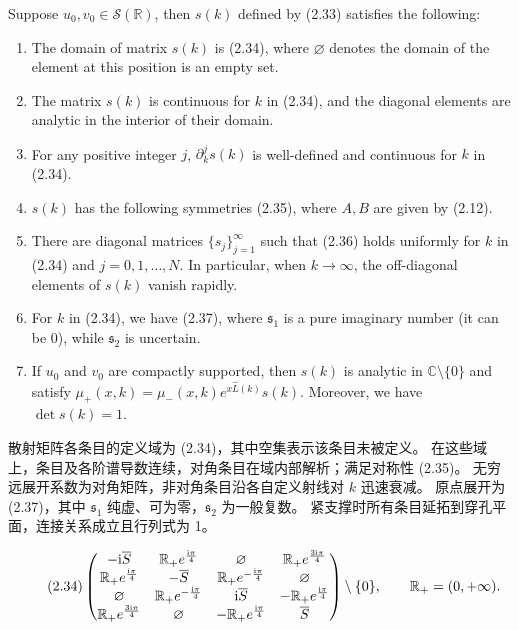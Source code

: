 \begin{paperpropositionen}\label{prop:2.4}
Suppose $u_0,v_0\in\mathcal S(\mathbb R)$, then $s(k)$ defined by (2.33) satisfies the following:
\begin{enumerate}[label=\alph*.]
\item The domain of matrix $s(k)$ is (2.34), where $\varnothing$ denotes the domain of the element at this position is an empty set.
\item The matrix $s(k)$ is continuous for $k$ in (2.34), and the diagonal elements are analytic in the interior of their domain.
\item For any positive integer $j$, $\partial_k^j s(k)$ is well-defined and continuous for $k$ in (2.34).
\item $s(k)$ has the following symmetries (2.35), where $A,B$ are given by (2.12).
\item There are diagonal matrices $\{s_j\}_{j=1}^\infty$ such that (2.36) holds uniformly for $k$ in (2.34) and $j=0,1,\ldots,N$. In particular, when $k\to\infty$, the off-diagonal elements of $s(k)$ vanish rapidly.
\item For $k$ in (2.34), we have (2.37), where $\mathfrak s_1$ is a pure imaginary number (it can be 0), while $\mathfrak s_2$ is uncertain.
\item If $u_0$ and $v_0$ are compactly supported, then $s(k)$ is analytic in $\mathbb C\setminus\{0\}$ and satisfy $\mu_+(x,k)=\mu_-(x,k)e^{x\widehat L(k)}s(k)$. Moreover, we have $\det s(k)=1$.
\end{enumerate}
\end{paperpropositionen}
\begin{paperpropositioncn*}
散射矩阵各条目的定义域为 (2.34)，其中空集表示该条目未被定义。
在这些域上，条目及各阶谱导数连续，对角条目在域内部解析；满足对称性 (2.35)。
无穷远展开系数为对角矩阵，非对角条目沿各自定义射线对 $k$ 迅速衰减。
原点展开为 (2.37)，其中 $\mathfrak s_1$ 纯虚、可为零，$\mathfrak s_2$ 为一般复数。
紧支撑时所有条目延拓到穿孔平面，连接关系成立且行列式为 1。
\end{paperpropositioncn*}
\begin{equation}
\originaleq{2.34}
\begin{pmatrix}
-\ii\overline S&\mathbb R_+e^{\frac{\ii\pi}{4}}&\varnothing&\mathbb R_+e^{\frac{3\ii\pi}{4}}\\
\mathbb R_+e^{\frac{\ii\pi}{4}}&-\overline S&\mathbb R_+e^{-\frac{\ii\pi}{4}}&\varnothing\\
\varnothing&\mathbb R_+e^{-\frac{\ii\pi}{4}}&\ii\overline S&-\mathbb R_+e^{\frac{\ii\pi}{4}}\\
\mathbb R_+e^{\frac{3\ii\pi}{4}}&\varnothing&-\mathbb R_+e^{\frac{\ii\pi}{4}}&\overline S
\end{pmatrix}\setminus\{0\},\qquad \mathbb R_+=(0,+\infty).
\end{equation}
